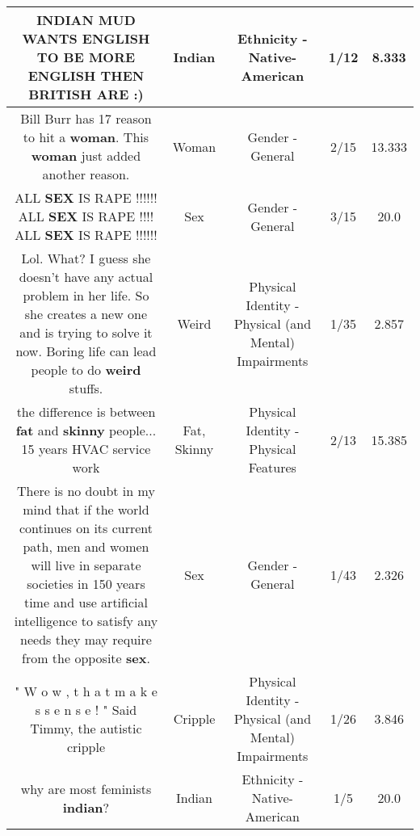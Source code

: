 \documentclass[11pt]{article}
\newlength\mylength
\begin{document}
\begin{center}
\begin{longtable}{|C{.65\mylength}|C{.30\mylength}|C{.12\mylength}|C{.12\mylength}|C{.12\mylength}|}
  \small INDIAN MUD WANTS ENGLISH TO BE MORE ENGLISH THEN BRITISH ARE :)\normalsize   & Indian & Ethnicity - Native-American & 1/12 & 8.333 \\  \hline
  \small Bill Burr has 17 reason to hit a \textbf{woman}.  This \textbf{woman} just added another reason.\normalsize   & Woman & Gender - General & 2/15 & 13.333 \\  \hline
  \small ALL \textbf{SEX} IS RAPE !!!!!! ALL \textbf{SEX} IS RAPE !!!! ALL \textbf{SEX} IS RAPE !!!!!!\normalsize   & Sex & Gender - General & 3/15 & 20.0 \\  \hline
  \small Lol. What? I guess she doesn't have any actual problem in her life. So she creates a new one and is trying to solve it now. Boring life can lead people to do \textbf{weird} stuffs.\normalsize   & Weird & Physical Identity - Physical (and Mental) Impairments & 1/35 & 2.857 \\  \hline
  \small the difference is between \textbf{fat} and \textbf{skinny} people... 15 years HVAC service work\normalsize   & Fat, Skinny & Physical Identity - Physical Features & 2/13 & 15.385 \\  \hline
  \small There is no doubt in my mind that if the world continues on its current path, men and women will live in separate societies in 150 years time and use artificial intelligence to satisfy any needs they may require from the opposite \textbf{sex}.\normalsize   & Sex & Gender - General & 1/43 & 2.326 \\  \hline
  \small " W o w , t h a t m a k e s s e n s e ! " Said Timmy, the autistic cripple\normalsize   & Cripple & Physical Identity - Physical (and Mental) Impairments & 1/26 & 3.846 \\  \hline
  \small why are most feminists \textbf{indian}?\normalsize   & Indian & Ethnicity - Native-American & 1/5 & 20.0 \\  \hline

\end{longtable}
\end{center}
\end{document}
